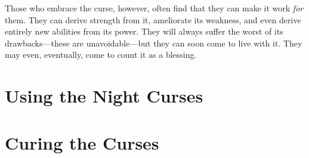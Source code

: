 Those who embrace the curse, however, often find that they can make it work \emph{for} them.
They can derive strength from it, ameliorate its weakness, and even derive entirely new abilities from its power.
They will always suffer the worst of its drawbacks---these are unavoidable---but they can soon come to live with it.
They may even, eventually, come to count it as a blessing.

\section{Using the Night Curses}



\section{Curing the Curses}


